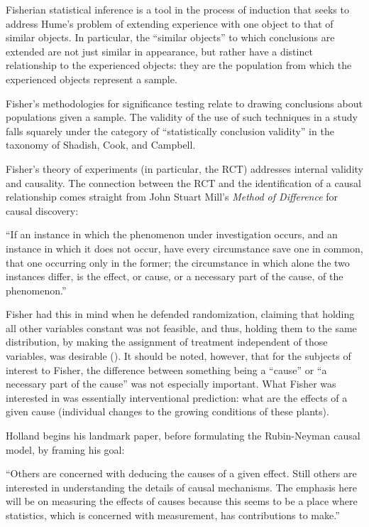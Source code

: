 \documentclass[a4paper,12pt]{article}
\begin{document}
Fisherian statistical inference is a tool in the process of induction that seeks to address Hume's problem of extending experience with one object to that of similar objects. In particular, the ``similar objects'' to which conclusions are extended are not just similar in appearance, but rather have a distinct relationship to the experienced objects: they are the population from which the experienced objects represent a sample.

Fisher's methodologies for significance testing relate to drawing conclusions about populations given a sample. The validity of the use of such techniques in a study falls squarely under the category of ``statistically conclusion validity'' in the taxonomy of Shadish, Cook, and Campbell.

Fisher's theory of experiments (in particular, the RCT) addresses internal validity and causality. The connection between the RCT and the identification of a causal relationship comes straight from John Stuart Mill's \parencite*{mill1884} \textit{Method of Difference} for causal discovery:

\begin{displayquote}
  ``If an instance in which the phenomenon under investigation occurs, and an instance in which it does not occur, have every circumstance save one in common, that one occurring only in the former; the circumstance in which alone the two instances differ, is the effect, or cause, or a necessary part of the cause, of the phenomenon.''
\end{displayquote}

Fisher \parencite*{Fisher1935} had this in mind when he defended randomization, claiming that holding all other variables constant was not feasible, and thus, holding them to the same distribution, by making the assignment of treatment independent of those variables, was desirable (\cite{Rosenbaum2005}). It should be noted, however, that for the subjects of interest to Fisher, the difference between something being a ``cause'' or ``a necessary part of the cause'' was not especially important. What Fisher was interested in was essentially interventional prediction: what are the effects of a given cause (individual changes to the growing conditions of these plants).

Holland \parencite*{Holland1986} begins his landmark paper, before formulating the Rubin-Neyman causal model, by framing his goal:

\begin{displayquote}
``Others are concerned with deducing the causes of a given effect. Still others are interested in understanding the details of causal mechanisms. The emphasis here will be on measuring the effects of causes because this seems to be a place where statistics, which is concerned with measurement, has contributions to make.''
\end{displayquote}
\end{document}
